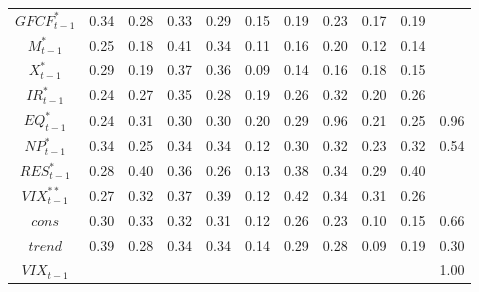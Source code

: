 \documentclass[a4paper, twoside]{templates/ociamthesis}
\begin{document}
\begin{table}[!ht]
\begin{tabular}[t]{ccccccccccc}
$GFCF^*_{t-1}$ & 0.34 & 0.28 & 0.33 & 0.29 & 0.15 & 0.19 & 0.23 & 0.17 & 0.19 & \\
$M^*_{t-1}$ & 0.25 & 0.18 & 0.41 & 0.34 & 0.11 & 0.16 & 0.20 & 0.12 & 0.14 & \\
$X^*_{t-1}$ & 0.29 & 0.19 & 0.37 & 0.36 & 0.09 & 0.14 & 0.16 & 0.18 & 0.15 & \\
$IR^*_{t-1}$ & 0.24 & 0.27 & 0.35 & 0.28 & 0.19 & 0.26 & 0.32 & 0.20 & 0.26 & \\
$EQ^*_{t-1}$ & 0.24 & 0.31 & 0.30 & 0.30 & 0.20 & 0.29 & 0.96 & 0.21 & 0.25 & 0.96\\
$NP^*_{t-1}$ & 0.34 & 0.25 & 0.34 & 0.34 & 0.12 & 0.30 & 0.32 & 0.23 & 0.32 & 0.54\\
$RES^*_{t-1}$ & 0.28 & 0.40 & 0.36 & 0.26 & 0.13 & 0.38 & 0.34 & 0.29 & 0.40 & \\
$VIX^{**}_{t-1}$ & 0.27 & 0.32 & 0.37 & 0.39 & 0.12 & 0.42 & 0.34 & 0.31 & 0.26 & \\
$cons$ & 0.30 & 0.33 & 0.32 & 0.31 & 0.12 & 0.26 & 0.23 & 0.10 & 0.15 & 0.66\\
$trend$ & 0.39 & 0.28 & 0.34 & 0.34 & 0.14 & 0.29 & 0.28 & 0.09 & 0.19 & 0.30\\
$VIX_{t-1}$ &  &  &  &  &  &  &  &  &  & 1.00\\
\bottomrule
\end{tabular}
\end{table}
\end{document}

